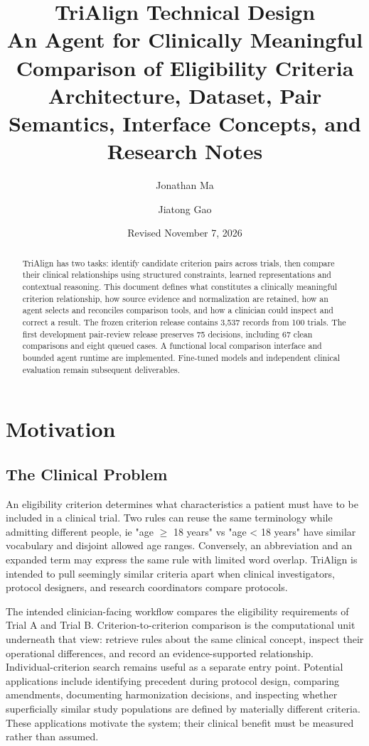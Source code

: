 \documentclass[10pt,letterpaper]{article}
\title{\textcolor{ink}{TriAlign Technical Design}\\[.4em]
  \large An Agent for Clinically Meaningful Comparison of Eligibility Criteria\\
  \normalsize Architecture, Dataset, Pair Semantics, Interface Concepts, and Research Notes}
\author{Jonathan Ma \and Jiatong Gao}
\date{Revised November 7, 2026}
\begin{document}
\maketitle
\begin{abstract}
TriAlign has two tasks: identify candidate criterion pairs across trials, then
compare their clinical relationships using structured constraints, learned
representations and contextual reasoning. This document defines what constitutes a clinically meaningful criterion relationship,
how source evidence and normalization are retained, how an agent selects and
reconciles comparison tools, and how a clinician could inspect and correct a
result. The frozen criterion release contains 3,537 records from 100 trials.
The first development pair-review release preserves 75 decisions, including
67 clean comparisons and eight queued cases. A functional local comparison interface and bounded agent runtime are implemented.
Fine-tuned models and independent clinical evaluation remain subsequent deliverables.
\end{abstract}

\newpage
\tableofcontents
\newpage

\section{Motivation}
\label{sec:motivation}

\subsection{The Clinical Problem}
An eligibility criterion determines what characteristics a patient must have to be included in a clinical trial.
Two rules can reuse the same terminology while admitting different people, ie "age $\ge$ 18 years" vs "age < 18 years" have similar vocabulary and disjoint allowed age ranges. Conversely,
an abbreviation and an expanded term may express the same rule with limited word overlap. TriAlign is intended to pull seemingly similar criteria apart when
clinical investigators, protocol designers, and research coordinators compare
protocols.

The intended clinician-facing workflow compares the eligibility requirements
of Trial A and Trial B. Criterion-to-criterion comparison is the computational
unit underneath that view: retrieve rules about the same clinical concept,
inspect their operational differences, and record an evidence-supported
relationship. Individual-criterion search remains useful as a separate entry
point. Potential applications include identifying precedent during
protocol design, comparing amendments, documenting harmonization decisions,
and inspecting whether superficially similar study populations are defined
by materially different criteria. These applications motivate the system;
their clinical benefit must be measured rather than assumed.
\end{document}
